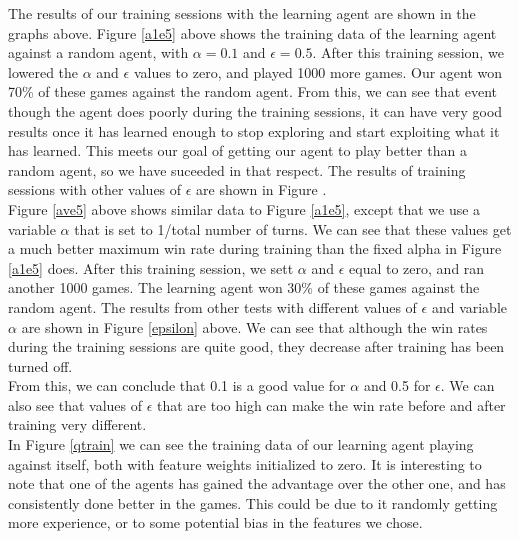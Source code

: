 \documentclass[letterpaper]{article}
\begin{document}
The results of our training sessions with the learning agent are shown in the graphs above. Figure \ref{a1e5} above shows the training data of the learning agent against a random agent, with $\alpha=0.1$ and $\epsilon=0.5$. After this training session, we lowered the $\alpha$ and $\epsilon$ values to zero, and played 1000 more games. Our agent won 70\% of these games against the random agent. From this, we can see that event though the agent does poorly during the training sessions, it can have very good results once it has learned enough to stop exploring and start exploiting what it has learned. This meets our goal of getting our agent to play better than a random agent, so we have suceeded in that respect. The results of training sessions with other values of $\epsilon$ are shown in Figure .\\

Figure \ref{ave5} above shows similar data to Figure \ref{a1e5}, except that we use a variable $\alpha$ that is set to 1/total number of turns. We can see that these values get a much better maximum win rate during training than the fixed alpha in Figure \ref{a1e5} does. After this training session, we sett $\alpha$ and $\epsilon$ equal to zero, and ran another 1000 games. The learning agent won 30\% of these games against the random agent. The results from other tests with different values of $\epsilon$ and variable $\alpha$ are shown in Figure \ref{epsilon} above. We can see that although the win rates during the training sessions are quite good, they decrease after training has been turned off.\\

From this, we can conclude that 0.1 is a good value for $\alpha$ and 0.5 for $\epsilon$. We can also see that values of $\epsilon$ that are too high can make the win rate before and after training very different.\\

In Figure \ref{qtrain} we can see the training data of our learning agent playing against itself, both with feature weights initialized to zero. It is interesting to note that one of the agents has gained the advantage over the other one, and has consistently done better in the games. This could be due to it randomly getting more experience, or to some potential bias in the features we chose.
\end{document}
